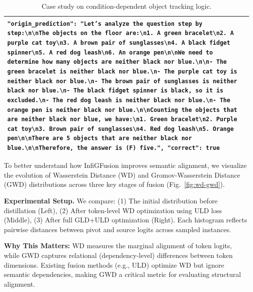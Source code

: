 \documentclass{article}
\begin{document}
\begin{table}[t]
{\begin{tabular}{p{} p{}}
\texttt{"origin\_prediction": "Let's analyze the question step by step:\textbackslash{}n\textbackslash{}nThe objects on the floor are:\textbackslash{}n1. A green bracelet\textbackslash{}n2. A purple cat toy\textbackslash{}n3. A brown pair of sunglasses\textbackslash{}n4. A black fidget spinner\textbackslash{}n5. A red dog leash\textbackslash{}n6. An orange pen\textbackslash{}n\textbackslash{}nWe need to determine how many objects are neither black nor blue.\textbackslash{}n\textbackslash{}n- The green bracelet is neither black nor blue.\textbackslash{}n- The purple cat toy is neither black nor blue.\textbackslash{}n- The brown pair of sunglasses is neither black nor blue.\textbackslash{}n- The black fidget spinner is black, so it is excluded.\textbackslash{}n- The red dog leash is neither black nor blue.\textbackslash{}n- The orange pen is neither black nor blue.\textbackslash{}n\textbackslash{}nCounting the objects that are neither black nor blue, we have:\textbackslash{}n1. Green bracelet\textbackslash{}n2. Purple cat toy\textbackslash{}n3. Brown pair of sunglasses\textbackslash{}n4. Red dog leash\textbackslash{}n5. Orange pen\textbackslash{}n\textbackslash{}nThere are 5 objects that are neither black nor blue.\textbackslash{}n\textbackslash{}nTherefore, the answer is (F) five.", "correct": true} \\
\bottomrule
\end{tabular}}
\caption{Case study on condition-dependent object tracking logic.}
\label{comparsionoflogic}
\end{table}


To better understand how InfiGFusion improves semantic alignment, we visualize the evolution of Wasserstein Distance (WD) and Gromov-Wasserstein Distance (GWD) distributions across three key stages of fusion (Fig.~\ref{fig:wd-gwd}).

\textbf{Experimental Setup.}
We compare:
(1) The initial distribution before distillation (Left),
(2) After token-level WD optimization using ULD loss (Middle),
(3) After full GLD+ULD optimization (Right).
Each histogram reflects pairwise distances between pivot and source logits across sampled instances.

\textbf{Why This Matters:}
WD measures the marginal alignment of token logits, while GWD captures relational (dependency-level) differences between token dimensions. Existing fusion methods (e.g., ULD) optimize WD but ignore semantic dependencies, making GWD a critical metric for evaluating structural alignment.
\end{document}
